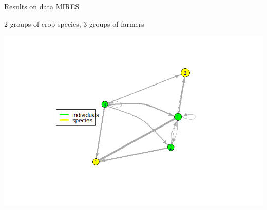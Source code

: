 \documentclass[compress,10pt]{beamer}
\begin{document}
%
%
% 
%
% 
%    
% 
%
%
% 
% 
    
\begin{frame}{Results on data MIRES}

2 groups of crop species, 3 groups of farmers

 \centering  \includegraphics[width =\linewidth]{plots/res_MIRES_MBM.png}



 \end{frame}
 
\end{document}
